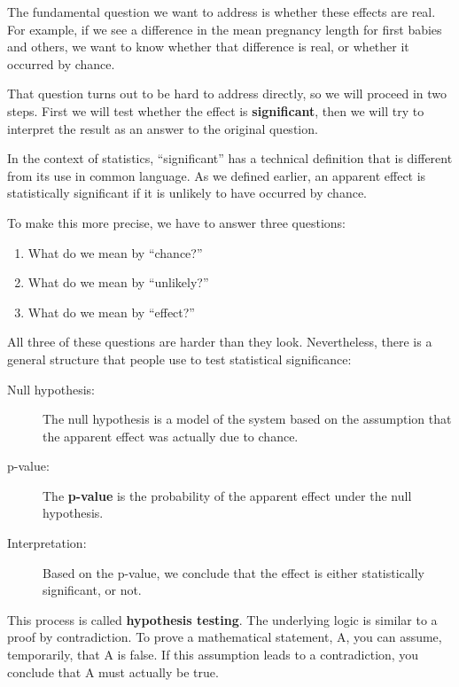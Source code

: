 \documentclass[12pt]{book}
\begin{document}
The fundamental question we want to address is whether these effects
are real.  For example, if we see a difference in the mean pregnancy
length for first babies and others, we want to know whether that
difference is real, or whether it occurred by chance.

That question turns out to be hard to address directly, so we will
proceed in two steps.  First we will test whether the effect is {\bf
  significant}, then we will try to interpret the result
  as an answer to the original question.

In the context of statistics, ``significant'' has a technical
definition that is different from its use in common language.
As we defined earlier, an apparent effect is statistically
significant if it is unlikely to have occurred by chance.

To make this more precise, we have to answer three questions:

\begin{enumerate}

\item What do we mean by ``chance?''

\item What do we mean by ``unlikely?''

\item What do we mean by ``effect?''

\end{enumerate}

All three of these questions are harder than they look.  Nevertheless,
there is a general structure that people use to test statistical
significance:

\begin{description}

\item[Null hypothesis:] The null hypothesis is a model of the system
  based on the assumption that the apparent effect was actually due to
  chance.

\item[p-value:] The {\bf p-value} is the probability of the apparent
  effect under the null hypothesis.

\item[Interpretation:] Based on the p-value, we conclude that the
  effect is either statistically significant, or not.

\end{description}

This process is called {\bf hypothesis testing}.  The underlying
logic is similar to a proof by contradiction.  To prove a mathematical
statement, A, you can assume, temporarily, that A is false.  If this
assumption leads to a contradiction, you conclude that A must actually
be true.
\end{document}
